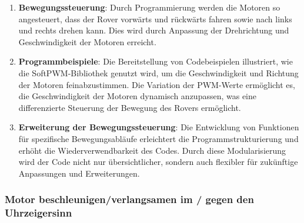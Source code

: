 \documentclass{vorlage-design-main}
\begin{document}
\begin{enumerate}
\def\labelenumi{\arabic{enumi}.}

\item
  \textbf{Bewegungssteuerung}: Durch Programmierung werden die Motoren
  so angesteuert, dass der Rover vorwärts und rückwärts fahren sowie
  nach links und rechts drehen kann. Dies wird durch Anpassung der
  Drehrichtung und Geschwindigkeit der Motoren erreicht.
\item
  \textbf{Programmbeispiele}: Die Bereitstellung von Codebeispielen
  illustriert, wie die SoftPWM-Bibliothek genutzt wird, um die
  Geschwindigkeit und Richtung der Motoren feinabzustimmen. Die
  Variation der PWM-Werte ermöglicht es, die Geschwindigkeit der Motoren
  dynamisch anzupassen, was eine differenzierte Steuerung der Bewegung
  des Rovers ermöglicht.
\item
  \textbf{Erweiterung der Bewegungssteuerung}: Die Entwicklung von
  Funktionen für spezifische Bewegungsabläufe erleichtert die
  Programmstrukturierung und erhöht die Wiederverwendbarkeit des Codes.
  Durch diese Modularisierung wird der Code nicht nur übersichtlicher,
  sondern auch flexibler für zukünftige Anpassungen und Erweiterungen.
\end{enumerate}

\newpage

\hypertarget{motor-beschleunigenverlangsamen-im-gegen-den-uhrzeigersinn}{%
\subsubsection{Motor beschleunigen/verlangsamen im / gegen den
Uhrzeigersinn}\label{motor-beschleunigenverlangsamen-im-gegen-den-uhrzeigersinn}}
\end{document}
